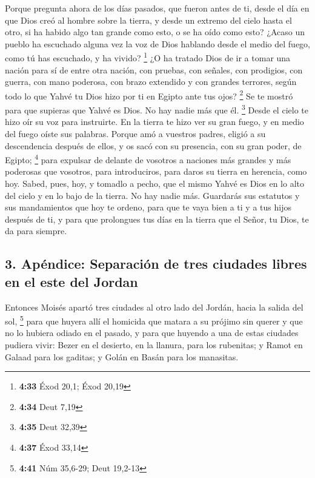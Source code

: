 \begin{paracol}{2}
 Porque pregunta ahora de los días pasados, que fueron
antes de ti, desde el día en que Dios creó al hombre sobre la tierra, y
desde un extremo del cielo hasta el otro, si ha habido algo tan grande
como esto, o se ha oído como esto?  ¿Acaso un pueblo ha
escuchado alguna vez la voz de Dios hablando desde el medio del fuego,
como tú has escuchado, y ha vivido? \footnote{\textbf{4:33} Éxod 20,1;
  Éxod 20,19}  ¿O ha tratado Dios de ir a tomar una
nación para sí de entre otra nación, con pruebas, con señales, con
prodigios, con guerra, con mano poderosa, con brazo extendido y con
grandes terrores, según todo lo que Yahvé tu Dios hizo por ti en Egipto
ante tus ojos? \footnote{\textbf{4:34} Deut 7,19}  Se te
mostró para que supieras que Yahvé es Dios. No hay nadie más que él.
\footnote{\textbf{4:35} Deut 32,39}  Desde el cielo te
hizo oír su voz para instruirte. En la tierra te hizo ver su gran fuego,
y en medio del fuego oíste sus palabras.  Porque amó a
vuestros padres, eligió a su descendencia después de ellos, y os sacó
con su presencia, con su gran poder, de Egipto; \footnote{\textbf{4:37}
  Éxod 33,14}  para expulsar de delante de vosotros a
naciones más grandes y más poderosas que vosotros, para introduciros,
para daros su tierra en herencia, como hoy.  Sabed, pues,
hoy, y tomadlo a pecho, que el mismo Yahvé es Dios en lo alto del cielo
y en lo bajo de la tierra. No hay nadie más.  Guardarás
sus estatutos y sus mandamientos que hoy te ordeno, para que te vaya
bien a ti y a tus hijos después de ti, y para que prolongues tus días en
la tierra que el Señor, tu Dios, te da para siempre.

\hypertarget{apuxe9ndice-separaciuxf3n-de-tres-ciudades-libres-en-el-este-del-jordan}{%
\subsection{3. Apéndice: Separación de tres ciudades libres en el este
del
Jordan}\label{apuxe9ndice-separaciuxf3n-de-tres-ciudades-libres-en-el-este-del-jordan}}

 Entonces Moisés apartó tres ciudades al otro lado del
Jordán, hacia la salida del sol, \footnote{\textbf{4:41} Núm 35,6-29;
  Deut 19,2-13}  para que huyera allí el homicida que
matara a su prójimo sin querer y que no lo hubiera odiado en el pasado,
y para que huyendo a una de estas ciudades pudiera vivir:
 Bezer en el desierto, en la llanura, para los rubenitas;
y Ramot en Galaad para los gaditas; y Golán en Basán para los manasitas.


\end{paracol}

